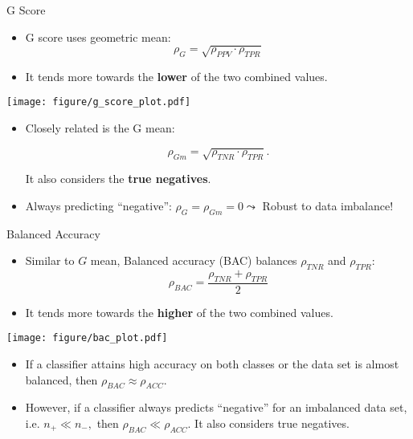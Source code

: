 \documentclass[11pt,compress,t,notes=noshow, xcolor=table]{beamer}
\begin{document}
\begin{vbframe}{G Score}
	\footnotesize
	
	\begin{minipage}[c]{0.5\textwidth}
	\footnotesize
	\begin{itemize}
		\item G score uses geometric mean: 
		$$\rho_{G} = \sqrt{\rho_{PPV} \cdot \rho_{TPR}}$$
		\item It tends more towards the \textbf{lower} of the two combined values.
	\end{itemize}
\end{minipage}%
\begin{minipage}[c]{0.5\textwidth}
	\centering
	\texttt{[image: figure/g\_score\_plot.pdf]}
\end{minipage}

\begin{itemize}
	\item Closely related is the G mean:

	$$\rho_{Gm} = \sqrt{\rho_{TNR} \cdot \rho_{TPR}}.$$

	It also considers the \textbf{true negatives}.
	
	\item Always predicting \enquote{negative}: $\rho_{G} = \rho_{Gm}  = 0 \leadsto$ Robust to data imbalance!

\end{itemize}
	
\end{vbframe}



\begin{vbframe}{Balanced Accuracy}
	\footnotesize
	
	\begin{minipage}[c]{0.5\textwidth}
		\footnotesize
		\begin{itemize}
			\item Similar to $G$ mean, Balanced accuracy (BAC) balances $\rho_{TNR}$ and $\rho_{TPR}$: 
			$$\rho_{BAC} = \frac{\rho_{TNR} + \rho_{TPR}}{2}$$
			\item  It tends more towards the \textbf{higher} of the two combined values.
		\end{itemize}
	\end{minipage}%
	\begin{minipage}[c]{0.5\textwidth}
		\centering
		\texttt{[image: figure/bac\_plot.pdf]}
	\end{minipage}
	\begin{itemize}
		\item If a classifier attains high accuracy on both classes or the data set is almost balanced, then $\rho_{BAC} \approx \rho_{ACC}$.
        \vspace{20pt}
        
		\item However, if a classifier always predicts ``negative'' for an imbalanced data set, i.e. $n_+  \ll n_-,$ then $\rho_{BAC} \ll \rho_{ACC}$. It also considers true negatives.

	\end{itemize}
	
\end{vbframe}
\end{document}
